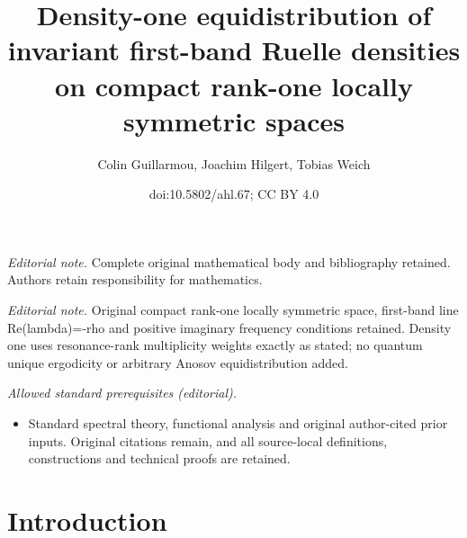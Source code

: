 \documentclass[10pt]{amsart}
\title{Density-one equidistribution of invariant first-band Ruelle densities on compact rank-one locally symmetric spaces}
\author{Colin Guillarmou, Joachim Hilgert, Tobias Weich}
\date{doi:10.5802/ahl.67; CC BY 4.0}
\theoremstyle{definition}
\begin{document}
\maketitle
\noindent\textit{Editorial note.} Complete original mathematical body and bibliography retained. Authors retain responsibility for mathematics.\par\medskip
\noindent\textit{Editorial note.} Original compact rank-one locally symmetric space, first-band line Re(lambda)=-rho and positive imaginary frequency conditions retained. Density one uses resonance-rank multiplicity weights exactly as stated; no quantum unique ergodicity or arbitrary Anosov equidistribution added.\par\medskip
\noindent\textit{Allowed standard prerequisites (editorial).}\begin{itemize}
\item Standard spectral theory, functional analysis and original author-cited prior inputs. Original citations remain, and all source-local definitions, constructions and technical proofs are retained.
\end{itemize}\medskip
\section{Introduction}
\end{document}
